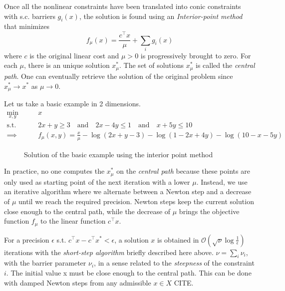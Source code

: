 \documentclass[11 pt]{report}
\begin{document}
Once all the nonlinear constraints have been translated into conic constraints with s.c. barriers $g_i(x)$, the solution is found using an \textit{Interior-point method} that minimizes
\begin{equation}
    f_{\mu} (x) = \frac{c^\top x}{\mu} + \sum_{i} g_i(x)
\end{equation}
where $c$ is the original linear cost and $\mu > 0$ is progressively brought to zero. For each $\mu$, there is an unique solution $x^*_{\mu}$. The set of solutions $x^*_{\mu}$ is called the \textit{central path}. One can eventually retrieve the solution of the original problem since $x^*_{\mu} \to x^*$ as $\mu \to 0$.

Let us take a basic example in 2 dimensions.
\begin{equation*}
\begin{aligned}
    \min_{x,y} \qquad &x\\
    \text{s.t.} \qquad & 2x + y \geq 3 \quad\text{and}\quad 2x - 4y \leq 1 \quad\text{and}\quad x + 5y \leq 10\\
    \implies \qquad & f_{\mu}(x,y) = \frac{x}{\mu} - \log(2x+y-3) - \log(1-2x+4y) - \log(10 - x - 5y)
\end{aligned}
\end{equation*}

\begin{figure}[ht]
    \centering
    
    \caption{Solution of the basic example using the interior point method}
    \label{fig:interior_pt}
\end{figure}

In practice, no one computes the $x^*_{\mu}$ on the \textit{central path} because these points are only used as starting point of the next iteration with a lower $\mu$. Instead, we use an iterative algorithm where we alternate between a Newton step and a decrease of $\mu$ until we reach the required precision. Newton steps keep the current solution close enough to the central path, while the decrease of $\mu$ brings the objective function $f_{\mu}$ to the linear function $c^\top x$. 

For a precision $\epsilon$ s.t. $c^\top x - c^\top x^* < \epsilon$, a solution $x$ is obtained in $\mathcal{O}(\sqrt{\nu} \log \frac{1}{\epsilon})$ iterations with the \textit{short-step algorithm} briefly described here above. $\nu = \sum_{i} \nu_i$, with the barrier parameter $\nu_i$, in a sense related to the \textit{steepness} of the constraint $i$. The initial value x must be close enough to the central path. This can be done with damped Newton steps from any admissible $x \in X$ CITE.
\end{document}
